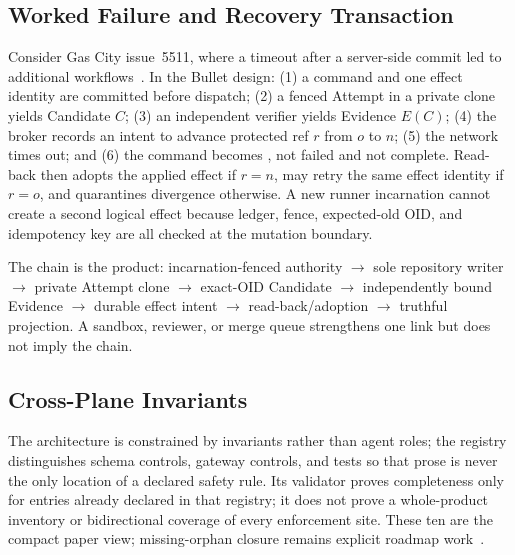 \documentclass[journal]{IEEEtran}
\newcommand{\code}[1]{\texttt{\detokenize{#1}}}
\begin{document}
\subsection{Worked Failure and Recovery Transaction}

Consider Gas City issue~5511, where a timeout after a server-side commit led
to additional workflows~\cite{gascity5511}. In the Bullet design: (1) a
command and one effect identity are committed before dispatch; (2) a fenced
Attempt in a private clone yields Candidate $C$; (3) an independent verifier
yields Evidence $E(C)$; (4) the broker records an intent to advance protected
ref $r$ from $o$ to $n$; (5) the network times out; and
(6) the command becomes \code{UNKNOWN}, not failed and not complete. Read-back
then adopts the applied effect if $r=n$, may retry the same effect identity if
$r=o$, and quarantines divergence otherwise. A new runner incarnation cannot
create a second logical effect because ledger, fence, expected-old OID, and
idempotency key are all checked at the mutation boundary.

The chain is the product: incarnation-fenced authority $\rightarrow$ sole
repository writer $\rightarrow$ private Attempt clone $\rightarrow$ exact-OID
Candidate $\rightarrow$ independently bound Evidence $\rightarrow$ durable
effect intent $\rightarrow$ read-back/adoption $\rightarrow$ truthful
projection. A sandbox, reviewer, or merge queue strengthens one link but does
not imply the chain.

\subsection{Cross-Plane Invariants}

The architecture is constrained by invariants rather than agent roles; the
registry distinguishes schema controls, gateway controls, and tests so that
prose is never the only location of a declared safety rule. Its validator proves
completeness only for entries already declared in that registry; it does not
prove a whole-product inventory or bidirectional coverage of every enforcement
site. These ten are the compact paper view; missing-orphan closure remains
explicit roadmap work~\cite{bulletRegistry,bulletClosure}.
\end{document}
